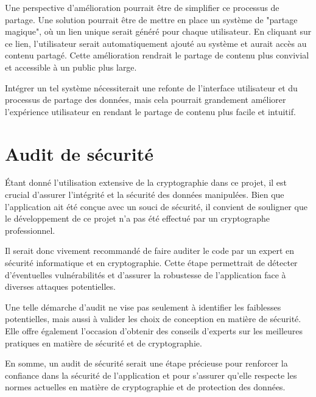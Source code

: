 Une perspective d'amélioration pourrait être de simplifier ce processus de partage. Une solution pourrait être de mettre en place un système de "partage magique", où un lien unique serait généré pour chaque utilisateur. En cliquant sur ce lien, l'utilisateur serait automatiquement ajouté au système et aurait accès au contenu partagé. Cette amélioration rendrait le partage de contenu plus convivial et accessible à un public plus large.

Intégrer un tel système nécessiterait une refonte de l'interface utilisateur et du processus de partage des données, mais cela pourrait grandement améliorer l'expérience utilisateur en rendant le partage de contenu plus facile et intuitif.

\section{Audit de sécurité}

Étant donné l'utilisation extensive de la cryptographie dans ce projet, il est crucial d'assurer l'intégrité et la sécurité des données manipulées. Bien que l'application ait été conçue avec un souci de sécurité, il convient de souligner que le développement de ce projet n'a pas été effectué par un cryptographe professionnel.

Il serait donc vivement recommandé de faire auditer le code par un expert en sécurité informatique et en cryptographie. Cette étape permettrait de détecter d'éventuelles vulnérabilités et d'assurer la robustesse de l'application face à diverses attaques potentielles.

Une telle démarche d'audit ne vise pas seulement à identifier les faiblesses potentielles, mais aussi à valider les choix de conception en matière de sécurité. Elle offre également l'occasion d'obtenir des conseils d'experts sur les meilleures pratiques en matière de sécurité et de cryptographie.

En somme, un audit de sécurité serait une étape précieuse pour renforcer la confiance dans la sécurité de l'application et pour s'assurer qu'elle respecte les normes actuelles en matière de cryptographie et de protection des données.